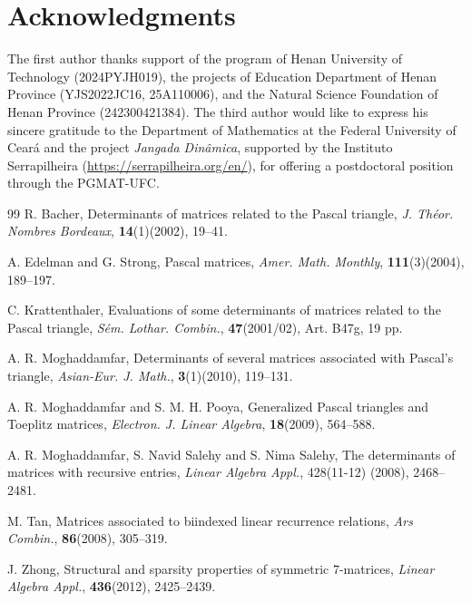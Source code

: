 \documentclass{amsart}
\begin{document}
\section*{Acknowledgments} The first author thanks support of the program of Henan
University of Technology (2024PYJH019), the projects of Education Department of
Henan Province (YJS2022JC16, 25A110006), and the Natural Science Foundation of Henan Province
(242300421384). The third author would like to express his sincere gratitude to the
Department of Mathematics at the Federal University of Cear\'{a} and the project
\emph{Jangada Din\^{a}mica}, supported by the Instituto Serrapilheira
(\url{https://serrapilheira.org/en/}), for offering a postdoctoral position through the PGMAT-UFC.
\begin{thebibliography}{99}
  R. Bacher,  Determinants of matrices related to the Pascal triangle, {\em J. Th\'eor. Nombres Bordeaux},  {\bf 14}(1)(2002), 19--41.

 A. Edelman and G. Strong, Pascal matrices, {\em Amer. Math. Monthly}, {\bf 111}(3)(2004), 189--197.

 C. Krattenthaler, Evaluations of some determinants of matrices related to the Pascal triangle, {\em S\'em. Lothar. Combin.},  {\bf 47}(2001/02), Art. B47g, 19 pp.

 A. R. Moghaddamfar, Determinants of several matrices associated with Pascal's triangle, {\em Asian-Eur. J. Math.}, {\bf 3}(1)(2010), 119--131.

 A. R. Moghaddamfar and S. M. H. Pooya,  Generalized Pascal triangles and Toeplitz matrices, {\em  Electron. J. Linear Algebra}, {\bf 18}(2009), 564--588.

 A. R. Moghaddamfar, S. Navid Salehy and S. Nima Salehy,  The determinants of matrices with recursive entries, {\em Linear Algebra Appl.},  428(11-12) (2008), 2468--2481.

 M. Tan, Matrices associated to biindexed linear recurrence relations, {\em  Ars Combin.}, {\bf 86}(2008), 305--319.

  J. Zhong, Structural and sparsity properties of symmetric $7$-matrices,  {\em Linear Algebra Appl.}, {\bf 436}(2012),  2425--2439.

\end{thebibliography}
\end{document}
